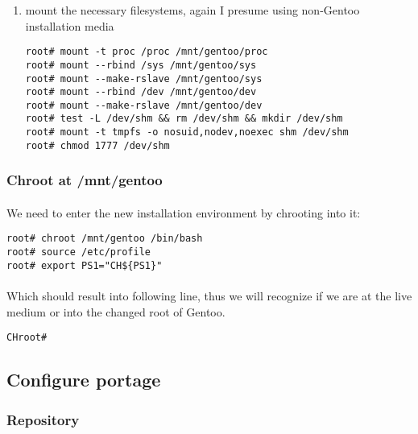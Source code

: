 \documentclass[10pt,a4paper]{article}
\begin{document}
\begin{enumerate}
                    \newpage
                    \item mount the necessary filesystems, again I presume using non-Gentoo installation media
\begin{lstlisting}[style=BashInputRoot]
root# mount -t proc /proc /mnt/gentoo/proc 
root# mount --rbind /sys /mnt/gentoo/sys 
root# mount --make-rslave /mnt/gentoo/sys
root# mount --rbind /dev /mnt/gentoo/dev 
root# mount --make-rslave /mnt/gentoo/dev 
root# test -L /dev/shm && rm /dev/shm && mkdir /dev/shm 
root# mount -t tmpfs -o nosuid,nodev,noexec shm /dev/shm
root# chmod 1777 /dev/shm
\end{lstlisting}
                    
                \end{enumerate}
            
            \newpage
            \subsubsection{Chroot at /mnt/gentoo}
                
                \paragraph{} We need to enter the new installation environment by chrooting into it:
\begin{lstlisting}[style=BashInputRoot]
root# chroot /mnt/gentoo /bin/bash
root# source /etc/profile
root# export PS1="CH${PS1}"
\end{lstlisting}
                
                \paragraph{} Which should result into following line, thus we will recognize if we are at the live medium or into the changed root of Gentoo.
\begin{lstlisting}[style=BashInputCHRoot]
 CHroot#
\end{lstlisting}
    
         \newpage
        \subsection{Configure portage}
            
            \subsubsection{Repository}
            
\end{document}
